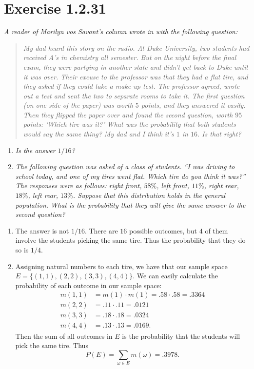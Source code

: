 \documentclass{tufte-handout}
\begin{document}
\section{Exercise 1.2.31}

\textit{A reader of Marilyn vos Savant's column wrote in with the
  following question:}
  \begin{quotation}
    \textit{My dad heard this story on the radio. At Duke University, two
    students had received A's in chemistry all semester. But on the
    night before the final exam, they were partying in another state
    and didn't get back to Duke until it was over. Their excuse to the
    professor was that they had a flat tire, and they asked if they
    could take a make-up test. The professor agreed, wrote out a test
    and sent the two to separate rooms to take it. The first question
    (on one side of the paper) was worth $5$ points, and they answered
    it easily. Then they flipped the paper over and found the second
    question, worth $95$ points: `Which tire was it?' What was the
    probability that both students would say the same thing? My dad
    and I think it's $1$ in $16$. Is that right?}
  \end{quotation}
\begin{enumerate}[label=\textit{(\alph*)}]
\item \textit{Is the answer $1/16$?}

\item \textit{The following question was asked of a class of
  students. ``I was driving to school today, and one of my tires
  went flat. Which tire do you think it was?'' The responses were as
  follows: right front, $58\%$, left front, $11\%$, right rear,
  $18\%$, left rear, $13\%$. Suppose that this distribution holds in
  the general population. What is the probability that they will
  give the same answer to the second question?}
\end{enumerate}

\bigskip

\begin{enumerate}[label=(\alph*)]
\item The answer is not $1/16$. There are $16$ possible
  outcomes, but $4$ of them involve the students picking the same
  tire. Thus the probability that they do so is $1/4$.
\item Assigning natural numbers to each tire, we have that
  our sample space $E = \{(1,1),(2,2),(3,3),(4,4)\}$. We can easily
  calculate the probability of each outcome in our sample space:
  \begin{align*}
    m(1,1) &= m(1) \cdot m(1) = .58 \cdot .58 = .3364\\
    m(2,2) &= .11 \cdot .11 = .0121\\
    m(3,3) &= .18 \cdot .18 = .0324\\
    m(4,4) &= .13 \cdot .13 = .0169.
  \end{align*}
  Then the sum of all outcomes in $E$ is the probability that the
  students will pick the same tire. Thus
  \[P(E) = \sum_{\omega \in E} m(\omega) = .3978.\]
\end{enumerate}
\end{document}
